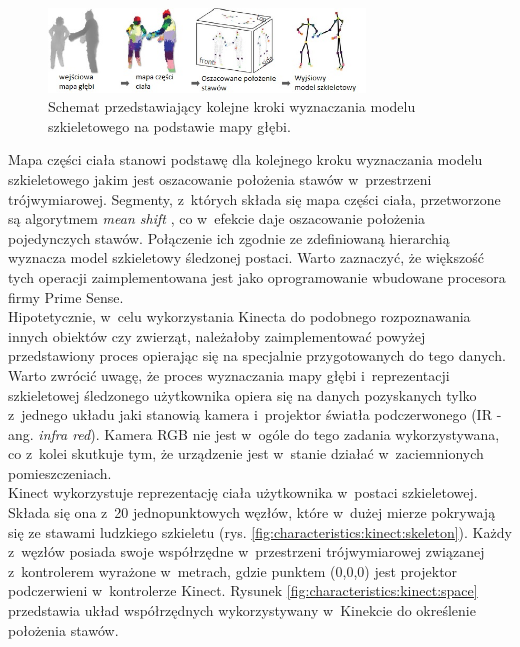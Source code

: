 \begin{figure}[!htp]
	\centering	
	\includegraphics[width=0.75\textwidth]{images/KinectRecognitionSteps.jpg}
	\caption{Schemat przedstawiający kolejne kroki wyznaczania modelu szkieletowego na podstawie mapy głębi.}
	\label{fig:literature:kinect:classificationSteps}
\end{figure}
		
Mapa części ciała stanowi podstawę dla kolejnego kroku wyznaczania modelu szkieletowego jakim jest oszacowanie położenia stawów w~przestrzeni trójwymiarowej. Segmenty, z~których składa się mapa części ciała, przetworzone są algorytmem \emph{mean shift} \cite{Comaniciu2003}, co w~efekcie daje oszacowanie położenia pojedynczych stawów. Połączenie ich zgodnie ze zdefiniowaną hierarchią wyznacza model szkieletowy śledzonej postaci. Warto zaznaczyć, że większość tych operacji zaimplementowana jest jako oprogramowanie wbudowane procesora firmy Prime Sense.\\
		
Hipotetycznie, w~celu wykorzystania Kinecta do podobnego rozpoznawania innych obiektów czy zwierząt, należałoby zaimplementować powyżej przedstawiony proces opierając się na specjalnie przygotowanych do tego danych.
Warto zwrócić uwagę, że proces wyznaczania mapy głębi i~reprezentacji szkieletowej śledzonego użytkownika opiera się na danych pozyskanych tylko z~jednego układu jaki stanowią kamera i~projektor światła podczerwonego (IR - ang. \textit{infra red}). Kamera RGB nie jest w~ogóle do tego zadania wykorzystywana, co z~kolei skutkuje tym, że urządzenie jest w~stanie działać w~zaciemnionych pomieszczeniach.\\
		
Kinect wykorzystuje reprezentację ciała użytkownika w~postaci szkieletowej. Składa się ona z~20 jednopunktowych węzłów, które w~dużej mierze pokrywają się ze stawami ludzkiego szkieletu (rys. \ref{fig:characteristics:kinect:skeleton}). Każdy z~węzłów posiada swoje współrzędne w~przestrzeni trójwymiarowej związanej z~kontrolerem wyrażone w~metrach, gdzie punktem (0,0,0) jest projektor podczerwieni w~kontrolerze Kinect. Rysunek \ref{fig:characteristics:kinect:space} przedstawia układ współrzędnych wykorzystywany w~Kinekcie do określenie położenia stawów. 
		
